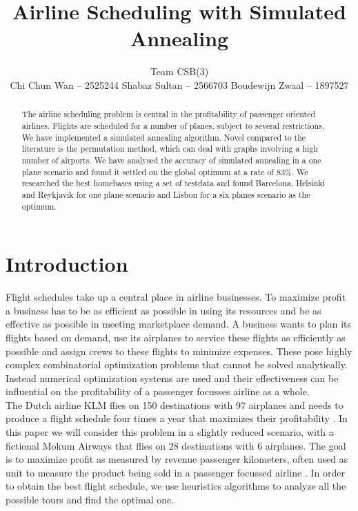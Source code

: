 \documentclass[journal]{IEEEtran}
\author{Team CSB(3)\\Chi Chun Wan -- 2525244 \hspace{0.1\textwidth} Shabaz Sultan -- 2566703 \hspace{0.1\textwidth} Boudewijn Zwaal -- 1897527}
\title{Airline Scheduling with Simulated Annealing}
\begin{document}
\maketitle

\begin{abstract}
\boldmath
The airline scheduling problem is central in the profitability of passenger oriented airlines. Flights are scheduled for a number of planes, subject to several restrictions. We have implemented a simulated annealing algorithm. Novel compared to the literature is the permutation method, which can deal with graphs involving a high number of airports. We have analysed the accuracy of simulated annealing in a one plane scenario and found it settled on the global optimum at a rate of $83\%$. We researched the best homebases using a set of testdata and found Barcelona, Helsinki and Reykjavik for one plane scenario and Lisbon for a six planes scenario as the optimum. 
\end{abstract}

\section{Introduction}
Flight schedules take up a central place in airline businesses. To maximize profit a business has to be as efficient as possible in using its resources and be as effective as possible in meeting marketplace demand. A business wants to plan its flights based on demand, use its airplanes to service these flights as efficiently as possible and assign crews to these flights to minimize expenses. These pose highly complex combinatorial optimization problems that cannot be solved analytically. Instead numerical optimization systems are used and their effectiveness can be influential on the profitability of a passenger focusses airline as a whole.\\
The Dutch airline KLM flies on 150 destinations with 97 airplanes and needs to produce a flight schedule four times a year that maximizes their profitability \cite{Bian2003}. In this paper we will consider this problem in a slightly reduced scenario, with a fictional Mokum Airways that flies on 28 destinations with 6 airplanes. The goal is to maximize profit as measured by revenue passenger kilometers, often used as unit to measure the product being sold in a passenger focussed airline \cite{Schefczyk1993}. In order to obtain the best flight schedule, we use heuristics algorithms to analyze all the possible tours and find the optimal one.\\
\end{document}
